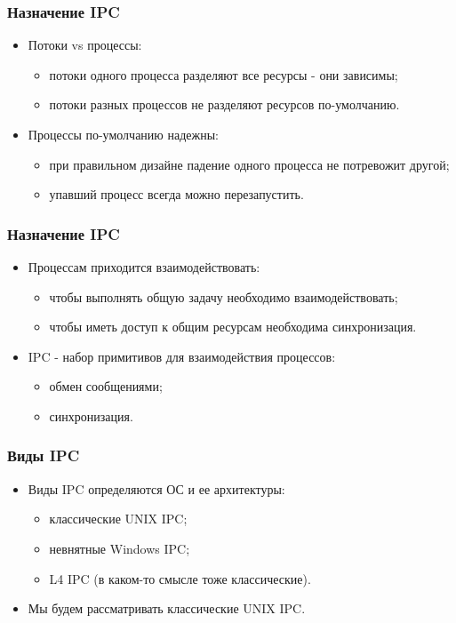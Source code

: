 \begin{frame}
\frametitle{Назначение IPC}
\begin{itemize}
  \item Потоки vs процессы:
  \begin{itemize}
    \item потоки одного процесса разделяют все ресурсы - они зависимы;
    \item потоки разных процессов не разделяют ресурсов по-умолчанию.
  \end{itemize}
  \item Процессы по-умолчанию надежны:
  \begin{itemize}
    \item при правильном дизайне падение одного процесса не потревожит другой;
    \item упавший процесс всегда можно перезапустить.
  \end{itemize}
\end{itemize}
\end{frame}

\begin{frame}
\frametitle{Назначение IPC}
\begin{itemize}
  \item Процессам приходится взаимодействовать:
  \begin{itemize}
    \item чтобы выполнять общую задачу необходимо взаимодействовать;
    \item чтобы иметь доступ к общим ресурсам необходима синхронизация.
  \end{itemize}
  \item IPC - набор примитивов для взаимодействия процессов:
  \begin{itemize}
    \item обмен сообщениями;
    \item синхронизация.
  \end{itemize}
\end{itemize}
\end{frame}

\begin{frame}
\frametitle{Виды IPC}
\begin{itemize}
  \item Виды IPC определяются ОС и ее архитектуры:
  \begin{itemize}
    \item классические UNIX IPC;
    \item невнятные Windows IPC;
    \item L4 IPC (в каком-то смысле тоже классические).
  \end{itemize}
  \item Мы будем рассматривать классические UNIX IPC.
\end{itemize}
\end{frame}
